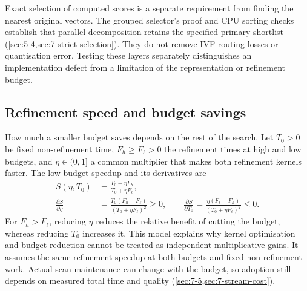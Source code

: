 Exact selection of computed scores is a separate requirement from
finding the nearest original vectors. The grouped selector's proof and
CPU sorting checks establish that parallel decomposition retains the
specified primary shortlist (\cref{sec:5-4,sec:7-strict-selection}).
They do not remove IVF routing losses or quantisation error. Testing
these layers separately distinguishes an implementation defect from a
limitation of the representation or refinement budget.

\subsection{Refinement speed and budget savings}

How much a smaller budget saves depends on the rest of the search.
Let $T_0>0$ be fixed non-refinement time, $F_h\geq F_\ell>0$ the
refinement times at high and low budgets, and $\eta\in(0,1]$ a common
multiplier that makes both refinement kernels faster. The low-budget
speedup and its derivatives are
\begin{align}
 S(\eta,T_0)&=\frac{T_0+\eta F_h}{T_0+\eta F_\ell},
 \label{eq:8-refinement-sensitivity}\\
 \frac{\partial S}{\partial\eta}
 &=\frac{T_0(F_h-F_\ell)}{(T_0+\eta F_\ell)^2}\geq0,\qquad
 \frac{\partial S}{\partial T_0}
 =\frac{\eta(F_\ell-F_h)}{(T_0+\eta F_\ell)^2}\leq0.\nonumber
\end{align}
For $F_h>F_\ell$, reducing $\eta$ reduces the relative benefit of
cutting the budget, whereas reducing $T_0$ increases it. This model
explains why kernel optimisation and budget reduction cannot be treated
as independent multiplicative gains. It assumes the same refinement
speedup at both budgets and fixed non-refinement work. Actual scan
maintenance can change with the budget, so adoption still depends on
measured total time and quality (\cref{sec:7-5,sec:7-stream-cost}).
